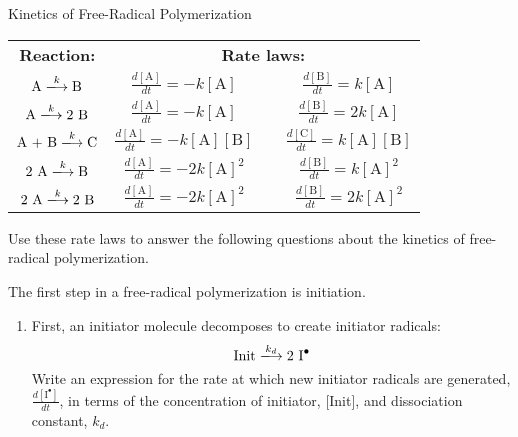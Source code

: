 \begin{activity}{Kinetics of Free-Radical Polymerization}
\begin{model}
	\vspace{-6pt}
	\begin{center}
		\renewcommand{\arraystretch}{2}
		\begin{tabular}{c c c c}
			\hspace{2cm}\textbf{Reaction:}\hspace{2cm} & \multicolumn{3}{c}{\hspace{0.5cm}\textbf{Rate laws:}\hspace{0.5cm}} \\
			$ \text{A} \xlongrightarrow{k} \text{B}$ & $\frac{d[\text{A}]}{dt} = -k[\text{A}]$ && $\frac{d[\text{B}]}{dt} = k[\text{A}]$ \\
			$ \text{A} \xlongrightarrow{k} 2\text{ B}$ & $\frac{d[\text{A}]}{dt} = -k[\text{A}]$ && $\frac{d[\text{B}]}{dt} = 2k[\text{A}]$ \\
			$\text{A + B} \xlongrightarrow{k} \text{C}$ & $\frac{d[\text{A}]}{dt} = -k[\text{A}][\text{B}]$ && $\frac{d[\text{C}]}{dt} = k[\text{A}][\text{B}]$ \\
			$\text{2 A} \xlongrightarrow{k} \text{B}$ & $\frac{d[\text{A}]}{dt} = -2k[\text{A}]^2$ && $\frac{d[\text{B}]}{dt} = k[\text{A}]^2$ \\
			$\text{2 A} \xlongrightarrow{k} \text{2 B}$ & $\frac{d[\text{A}]}{dt} = -2k[\text{A}]^2$ && $\frac{d[\text{B}]}{dt} = 2 k[\text{A}]^2$ 
		\end{tabular}
	\end{center}
	Use these rate laws to answer the following questions about the kinetics of free-radical polymerization.
	
\end{model}


\begin{ctqs}

	\question The first step in a free-radical polymerization is initiation.  
		
		\begin{enumerate}
		
			\item First, an initiator molecule decomposes to create initiator radicals: \label{\labelbase:ctq:initdecomp}
				\begin{equation*}
					\text{Init} \xlongrightarrow{k_d} \text{2 \ce{I^.}}
				\end{equation*}	
				Write an expression for the rate at which new initiator radicals are generated, $\frac{d[\text{I}^{\bullet}]}{dt}$, in terms of the concentration of initiator, [Init], and dissociation constant, $k_d$.
		

\end{enumerate}
\end{ctqs}
\end{activity}

